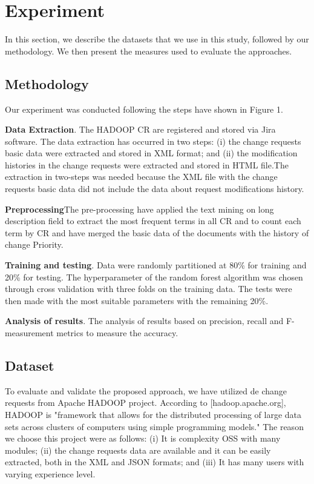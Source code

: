 \documentclass[10pt, conference]{IEEEtran}
\begin{document}
\section{Experiment}
In this section, we describe the datasets that we use in this study, followed by our methodology. We then present the measures used to evaluate the approaches.

\subsection{Methodology}
Our experiment was conducted following the steps have shown in Figure 1.


\textbf{Data Extraction}. The HADOOP CR are registered and stored via Jira
software. The data extraction has occurred in two steps: (i) the change
requests basic data were extracted and stored in XML format; and (ii) the
modification histories in the change requests were extracted and stored in HTML
file.The extraction in two-steps was needed because the XML file with the
change requests basic data did not include the data about request modifications
history. 

\textbf{Preprocessing}The pre-processing have applied the text mining on long
description field to extract the most frequent terms in all CR and to count
each term by CR and have merged the basic data of the documents with the
history of change Priority.

\textbf{Training and testing}. Data were randomly partitioned at 80\% for
training and 20\% for testing. The hyperparameter of the random forest
algorithm was chosen through cross validation with three folds on the training
data. The tests were then made with the most suitable parameters with the
remaining 20\%.  

\textbf{Analysis of results}. The analysis of results based on precision, recall and F-measurement metrics to measure the accuracy.

\subsection{Dataset}
To evaluate and validate the proposed approach, we have utilized de change requests from Apache HADOOP project. According to [hadoop.apache.org], HADOOP is "framework that allows for the distributed processing of large data sets across clusters of computers using simple programming models." The reason we
choose this project were as follows: (i) It is complexity OSS with many modules; (ii) the change requests data are available and it can be easily
extracted, both in the XML and JSON formats; and (iii) It has many users with varying experience level.
\end{document}
